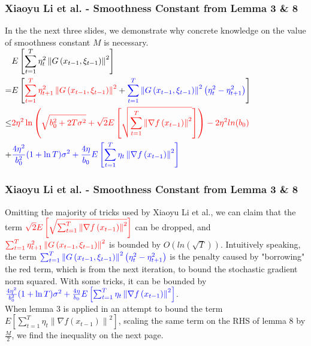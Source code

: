 \documentclass{beamer}
\begin{document}
\begin{frame}
\frametitle{Xiaoyu Li et al. - Smoothness Constant from Lemma 3 \& 8} 
In the the next three slides, we demonstrate why concrete knowledge on the value of smoothness constant $M$ is necessary.
$\begin{aligned} & E\left[\sum_{t=1}^T \eta_t^2\left\|G\left(x_{t-1}, \xi_{t-1}\right)\right\|^2\right]\\ =&E\left[\color{red}\sum_{t=1}^T \eta_{t+1}^2\left\|G\left(x_{t-1}, \xi_{t-1}\right)\right\|^2\color{black}+\color{blue}\sum_{t=1}^T\left\|G\left(x_{t-1}, \xi_{t-1}\right)\right\|^2\left(\eta_t^2-\eta_{t+1}^2\right)\color{black}\right] \\  \leq & \color{red}2 \eta^2 \ln \left(\sqrt{b_0^2+2 T \sigma^2}+\sqrt{2} E\left[\sqrt{\sum_{t=1}^T\left\|\nabla f\left(x_{t-1}\right)\right\|^2}\right]\right) - 2\eta^2 ln(b_0)\\ \color{black}+ &\color{blue}\frac{4 \eta^2}{b_0^2}(1+\ln T) \sigma^2+\frac{4 \eta}{b_0} E\left[\sum_{t=1}^T \eta_t\left\|\nabla f\left(x_{t-1}\right)\right\|^2\right]\end{aligned}$

\end{frame}

\begin{frame}
\frametitle{Xiaoyu Li et al. - Smoothness Constant from Lemma 3 \& 8} 
Omitting the majority of tricks used by Xiaoyu Li et al., we can claim that the term $\color{red}\sqrt{2} E\left[\sqrt{\sum_{t=1}^T\left\|\nabla f\left(x_{t-1}\right)\right\|^2}\right]$ can be dropped, and $\color{red}\sum_{t=1}^T \eta_{t+1}^2\left\|G\left(x_{t-1}, \xi_{t-1}\right)\right\|^2$ is bounded by $O(ln(\sqrt{T}))$.
Intuitively speaking, the term $\color{blue}\sum_{t=1}^T\left\|G\left(x_{t-1}, \xi_{t-1}\right)\right\|^2\left(\eta_t^2-\eta_{t+1}^2\right)$ is the penalty caused by "borrowing" the red term, which is from the next iteration, to bound the stochastic gradient norm squared. With some tricks, it can be bounded by $\color{blue}\frac{4 \eta^2}{b_0^2}(1+\ln T) \sigma^2+\frac{4 \eta}{b_0} E\left[\sum_{t=1}^T \eta_t\left\|\nabla f\left(x_{t-1}\right)\right\|^2\right]$.\\
When lemma 3 is applied in an attempt to bound the term $E\left[\sum_{t=1}^T \eta_t\left\|\nabla f\left(x_{t-1}\right)\right\|^2\right]$, scaling the same term on the RHS of lemma 8 by $\frac{M}{2}$, we find the inequality on the next page.
\end{frame}
\end{document}
